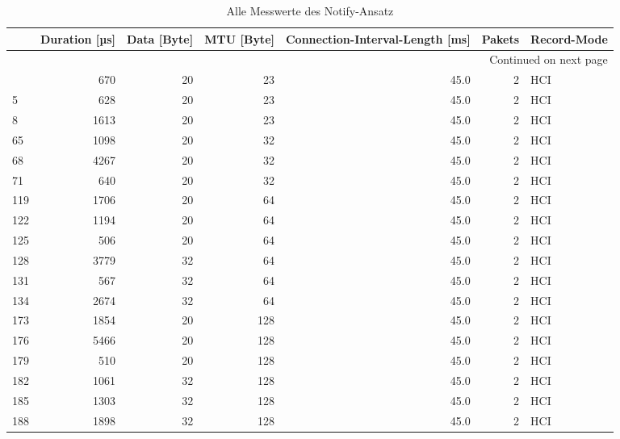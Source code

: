 \begin{longtable}{lrrrrrl}
\caption{Alle Messwerte des Notify-Ansatz}\label{table:notifyallvalues}\\
\toprule
{} &  Duration [µs] &  Data [Byte] &  MTU [Byte] &  Connection-Interval-Length [ms] &  Pakets & Record-Mode \\
\midrule
\endhead
\midrule
\multicolumn{7}{r}{{Continued on next page}} \\
\midrule
\endfoot

\bottomrule
\endlastfoot
2   &       670 &         20 &        23 &           45.0 &       2 &  HCI \\
5   &       628 &         20 &        23 &           45.0 &       2 &  HCI \\
8   &      1613 &         20 &        23 &           45.0 &       2 &  HCI \\
65  &      1098 &         20 &        32 &           45.0 &       2 &  HCI \\
68  &      4267 &         20 &        32 &           45.0 &       2 &  HCI \\
71  &       640 &         20 &        32 &           45.0 &       2 &  HCI \\
119 &      1706 &         20 &        64 &           45.0 &       2 &  HCI \\
122 &      1194 &         20 &        64 &           45.0 &       2 &  HCI \\
125 &       506 &         20 &        64 &           45.0 &       2 &  HCI \\
128 &      3779 &         32 &        64 &           45.0 &       2 &  HCI \\
131 &       567 &         32 &        64 &           45.0 &       2 &  HCI \\
134 &      2674 &         32 &        64 &           45.0 &       2 &  HCI \\
173 &      1854 &         20 &       128 &           45.0 &       2 &  HCI \\
176 &      5466 &         20 &       128 &           45.0 &       2 &  HCI \\
179 &       510 &         20 &       128 &           45.0 &       2 &  HCI \\
182 &      1061 &         32 &       128 &           45.0 &       2 &  HCI \\
185 &      1303 &         32 &       128 &           45.0 &       2 &  HCI \\
188 &      1898 &         32 &       128 &           45.0 &       2 &  HCI \\

\end{longtable}
